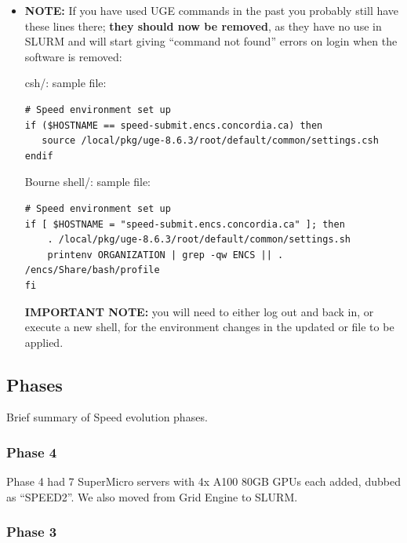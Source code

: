 \documentclass{easychair}
\begin{document}
\begin{itemize}
\item
\noindent
\textbf{NOTE:} If you have used UGE commands in the past you probably still have these
lines there; \textbf{they should now be removed}, as they have no use in SLURM and
will start giving ``command not found'' errors on login when the software is removed:

csh/: sample  file:
\begin{verbatim}
# Speed environment set up 
if ($HOSTNAME == speed-submit.encs.concordia.ca) then
   source /local/pkg/uge-8.6.3/root/default/common/settings.csh
endif
\end{verbatim}

Bourne shell/: sample  file:
\begin{verbatim}
# Speed environment set up 
if [ $HOSTNAME = "speed-submit.encs.concordia.ca" ]; then
    . /local/pkg/uge-8.6.3/root/default/common/settings.sh
    printenv ORGANIZATION | grep -qw ENCS || . /encs/Share/bash/profile
fi
\end{verbatim}

\textbf{IMPORTANT NOTE:} you will need to either log out and back in, or execute a new shell, 
for the environment changes in the updated  or  file to be applied.

\end{itemize}

\subsection{Phases}
\label{sect:phases}

Brief summary of Speed evolution phases.

\subsubsection{Phase 4}

Phase 4 had 7 SuperMicro servers with 4x A100 80GB GPUs each added,
dubbed as ``SPEED2''. We also moved from Grid Engine to SLURM.

\subsubsection{Phase 3}
\end{document}
